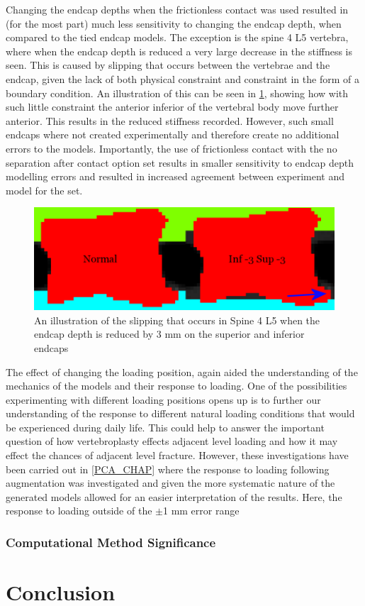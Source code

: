 Changing the endcap depths when the frictionless contact was used resulted in
(for the most part) much less sensitivity to changing the endcap depth, when
compared to the tied endcap models. The exception is the spine 4 L5 vertebra,
where when the endcap depth is reduced a very large decrease in the stiffness
is seen. This is caused by slipping that occurs between the vertebrae and the
endcap, given the lack of both physical constraint and constraint in the form
of a boundary condition. An illustration of this can be seen in
\cref{fig:EC-3slip}, showing how with such little constraint the anterior
inferior of the vertebral body move further anterior. This results in the
reduced stiffness recorded. However, such small endcaps where not created
experimentally and therefore create no additional errors to the models.
Importantly, the use of frictionless contact with the no separation after
contact option set results in smaller sensitivity to endcap depth modelling
errors and resulted in increased agreement between experiment and model for the
set.


\begin{figure}[h!]
  \centering
\includegraphics[width=.65\textwidth]{Chapters/Chapter_HT_images/EC-3slip.png}
\caption{An illustration of the slipping that occurs in Spine 4 L5 when the
endcap depth is reduced by 3 mm on the superior and inferior endcaps}
	\label{fig:EC-3slip}
\end{figure}

The effect of changing the loading position, again aided the understanding of
the mechanics of the models and their response to loading. One of the
possibilities experimenting with different loading positions opens up is to
further our understanding of the response to different natural loading
conditions that would be experienced during daily life. This could help to
answer the important question of how vertebroplasty effects adjacent level
loading and how it may effect the chances of adjacent level fracture. However,
these investigations have been carried out in \cref{PCA_CHAP} where the
response to loading following augmentation was investigated and given the more
systematic nature of the generated models allowed for an easier interpretation
of the results. Here, the response to loading outside of the $\pm$1 mm error
range


\subsubsection{Computational Method Significance}

\section{Conclusion}







